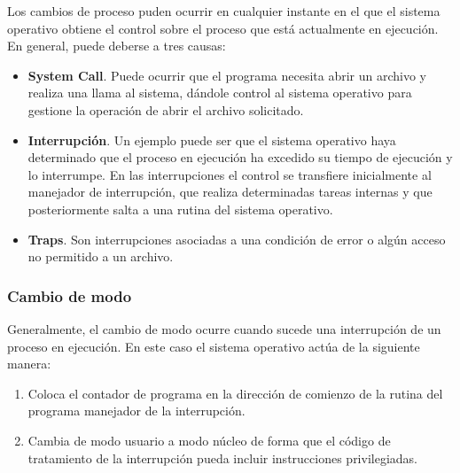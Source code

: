 \documentclass[12pt]{article}
\begin{document}
  Los cambios de proceso puden ocurrir en cualquier instante en el que el sistema operativo obtiene el control sobre el proceso que está actualmente en ejecución. En general, puede deberse a tres causas:
  \begin{itemize}
    \item \textbf{System Call}. Puede ocurrir que el programa necesita abrir un archivo y realiza una llama al sistema, dándole control al sistema operativo para gestione la operación de abrir el archivo solicitado.

    \item \textbf{Interrupción}. Un ejemplo puede ser que el sistema operativo haya determinado que el proceso en ejecución ha excedido su tiempo de ejecución y lo interrumpe. En las interrupciones el control se transfiere inicialmente al manejador de interrupción, que realiza determinadas tareas internas y que posteriormente salta a una rutina del sistema operativo.

    \item \textbf{Traps}. Son interrupciones asociadas a una condición de error o algún acceso no permitido a un archivo.
  \end{itemize}

  \subsubsection{Cambio de modo}
  Generalmente, el cambio de modo ocurre cuando sucede una interrupción de un proceso en ejecución. En este caso el sistema operativo actúa de la siguiente manera: 
  \begin{enumerate}[1.]
    \item Coloca el contador de programa en la dirección de comienzo de la rutina del programa manejador de la interrupción.

    \item Cambia de modo usuario a modo núcleo de forma que el código de tratamiento de la interrupción pueda incluir instrucciones privilegiadas.
  \end{enumerate}
\end{document}
